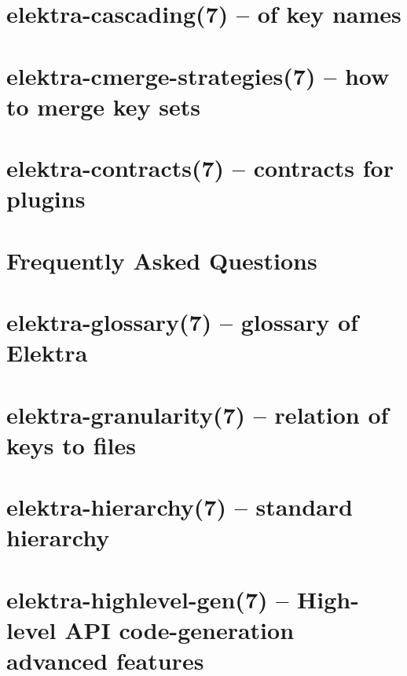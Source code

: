 \let\mypdfximage\pdfximage\def\pdfximage{\immediate\mypdfximage}\documentclass[twoside]{book}
\newcommand{\+}{\discretionary{\mbox{\scriptsize$\hookleftarrow$}}{}{}}
\begin{document}
\chapter{elektra-\/cascading(7) -- of key names}
\label{doc_help_elektra-cascading_md}

\chapter{elektra-\/cmerge-\/strategies(7) -- how to merge key sets}
\label{doc_help_elektra-cmerge-strategy_md}

\chapter{elektra-\/contracts(7) -- contracts for plugins}
\label{doc_help_elektra-contracts_md}

\chapter{Frequently Asked Questions}
\label{doc_help_elektra-faq_md}

\chapter{elektra-\/glossary(7) -- glossary of Elektra}
\label{doc_help_elektra-glossary_md}

\chapter{elektra-\/granularity(7) -- relation of keys to files}
\label{doc_help_elektra-granularity_md}

\chapter{elektra-\/hierarchy(7) -- standard hierarchy}
\label{doc_help_elektra-hierarchy_md}

\chapter{elektra-\/highlevel-\/gen(7) -- High-\/level API code-\/generation advanced features}
\label{doc_help_elektra-highlevel-gen_md}

\end{document}
